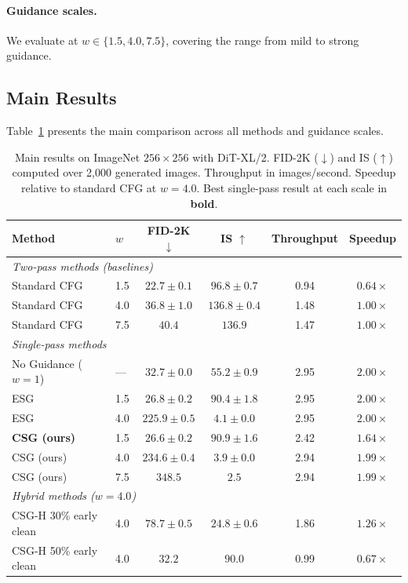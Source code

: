 \documentclass{article}
\begin{document}
\paragraph{Guidance scales.} We evaluate at $w \in \{1.5, 4.0, 7.5\}$, covering the range from mild to strong guidance.

\subsection{Main Results}

Table~\ref{tab:main} presents the main comparison across all methods and guidance scales.

\begin{table}[t]
\caption{Main results on ImageNet $256\times 256$ with DiT-XL/2. FID-2K ($\downarrow$) and IS ($\uparrow$) computed over 2,000 generated images. Throughput in images/second. Speedup relative to standard CFG at $w = 4.0$. Best single-pass result at each scale in \textbf{bold}.}
\label{tab:main}
\centering\small
\begin{tabular}{llcccc}
\toprule
Method & $w$ & FID-2K $\downarrow$ & IS $\uparrow$ & Throughput & Speedup \\
\midrule
\multicolumn{6}{l}{\textit{Two-pass methods (baselines)}} \\
Standard CFG & 1.5 & $22.7 \pm 0.1$ & $96.8 \pm 0.7$ & 0.94 & $0.64\times$ \\
Standard CFG & 4.0 & $36.8 \pm 1.0$ & $136.8 \pm 0.4$ & 1.48 & $1.00\times$ \\
Standard CFG & 7.5 & $40.4$ & $136.9$ & 1.47 & $1.00\times$ \\
\midrule
\multicolumn{6}{l}{\textit{Single-pass methods}} \\
No Guidance ($w{=}1$) & --- & $32.7 \pm 0.0$ & $55.2 \pm 0.9$ & 2.95 & $2.00\times$ \\
ESG & 1.5 & $26.8 \pm 0.2$ & $90.4 \pm 1.8$ & 2.95 & $2.00\times$ \\
ESG & 4.0 & $225.9 \pm 0.5$ & $4.1 \pm 0.0$ & 2.95 & $2.00\times$ \\
\textbf{CSG (ours)} & 1.5 & $\mathbf{26.6 \pm 0.2}$ & $\mathbf{90.9 \pm 1.6}$ & 2.42 & $1.64\times$ \\
CSG (ours) & 4.0 & $234.6 \pm 0.4$ & $3.9 \pm 0.0$ & 2.94 & $1.99\times$ \\
CSG (ours) & 7.5 & $348.5$ & $2.5$ & 2.94 & $1.99\times$ \\
\midrule
\multicolumn{6}{l}{\textit{Hybrid methods ($w = 4.0$)}} \\
CSG-H 30\% early clean & 4.0 & $78.7 \pm 0.5$ & $24.8 \pm 0.6$ & 1.86 & $1.26\times$ \\
CSG-H 50\% early clean & 4.0 & $\mathbf{32.2}$ & $90.0$ & 0.99 & $0.67\times$ \\
\bottomrule
\end{tabular}
\end{table}
\end{document}
